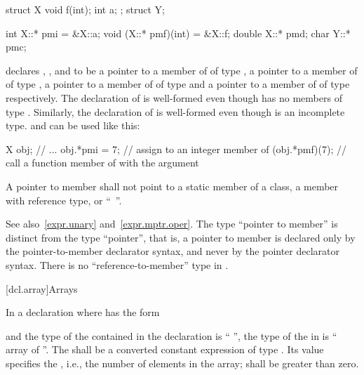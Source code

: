 \pnum
\begin{example}
\begin{codeblock}
struct X {
  void f(int);
  int a;
};
struct Y;

int X::* pmi = &X::a;
void (X::* pmf)(int) = &X::f;
double X::* pmd;
char Y::* pmc;
\end{codeblock}
declares
,
,
and
to be a pointer to a member of
of type
,
a pointer to a member of
of type
,
a pointer to a member of
of type
and a pointer to a member of
of type
respectively.
The declaration of
is well-formed even though
has no members of type
.
Similarly, the declaration of
is well-formed even though
is an incomplete type.
and
can be used like this:
\begin{codeblock}
X obj;
// ...
obj.*pmi = 7;       // assign  to an integer member of 
(obj.*pmf)(7);      // call a function member of  with the argument 
\end{codeblock}
\end{example}

\pnum
A pointer to member shall not point to a static member
of a class,
a member with reference type,
or
``\cv{}~''.

\pnum
\begin{note}
See also~\ref{expr.unary} and~\ref{expr.mptr.oper}.
The type ``pointer to member'' is distinct from the type ``pointer'',
that is, a pointer to member is declared only by the pointer-to-member
declarator syntax, and never by the pointer declarator syntax.
There is no ``reference-to-member'' type in \Cpp{}.
\end{note}

[dcl.array]{Arrays}%

\pnum
In a declaration   where  has the form
\begin{ncsimplebnf}
 \terminal{[}  \terminal{]} 
\end{ncsimplebnf}
and the type of the contained 
in the declaration  
is `` '',
the type of the  in  is
`` array of  ''.
The 
shall be a converted constant expression of type .
%
Its value  specifies the ,
i.e., the number of elements in the array;
 shall be greater than zero.

